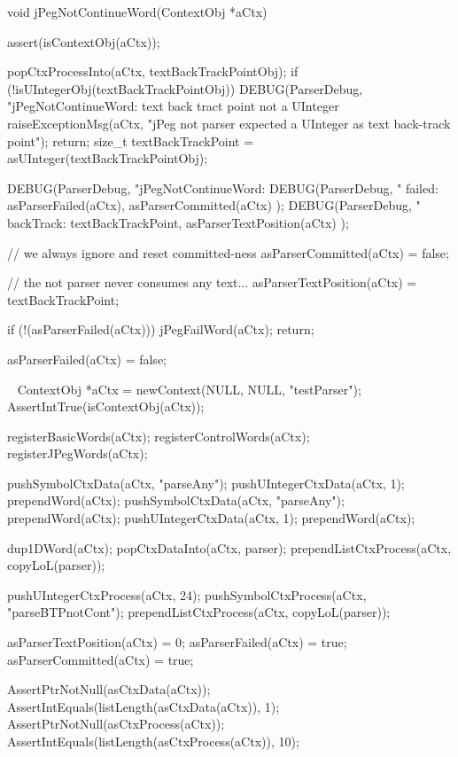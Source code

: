 \startCCode
void jPegNotContinueWord(ContextObj *aCtx) {
  assert(isContextObj(aCtx));

  popCtxProcessInto(aCtx, textBackTrackPointObj);
  if (!isUIntegerObj(textBackTrackPointObj)) {
    DEBUG(ParserDebug,
      "jPegNotContinueWord: text back tract point not a UInteger%
    raiseExceptionMsg(aCtx,
      "jPeg not parser expected a UInteger as text back-track point");
    return;
  }
  size_t textBackTrackPoint = asUInteger(textBackTrackPointObj);
  
  DEBUG(ParserDebug, "jPegNotContinueWord:%
  DEBUG(ParserDebug,
    "  failed: %
    asParserFailed(aCtx), asParserCommitted(aCtx)
  );
  DEBUG(ParserDebug,
    "  backTrack: %
    textBackTrackPoint, asParserTextPosition(aCtx)
  );

  // we always ignore and reset committed-ness
  asParserCommitted(aCtx) = false;
  
  // the not parser never consumes any text...
  asParserTextPosition(aCtx) = textBackTrackPoint;
  
  if (!(asParserFailed(aCtx))) {
    jPegFailWord(aCtx);
    return;
  }

  asParserFailed(aCtx) = false;
}
\stopCCode

\CTestsSuiteSetup\
\startCTest
  ContextObj *aCtx = newContext(NULL, NULL, "testParser");
  AssertIntTrue(isContextObj(aCtx));
  
  registerBasicWords(aCtx);
  registerControlWords(aCtx);
  registerJPegWords(aCtx);
  
  pushSymbolCtxData(aCtx, "parseAny");
  pushUIntegerCtxData(aCtx, 1);
  prependWord(aCtx);
  pushSymbolCtxData(aCtx, "parseAny");
  prependWord(aCtx);
  pushUIntegerCtxData(aCtx, 1);
  prependWord(aCtx);  
\stopCTest

\startCTest
  dup1DWord(aCtx);
  popCtxDataInto(aCtx, parser);
  prependListCtxProcess(aCtx, copyLoL(parser));
  
  pushUIntegerCtxProcess(aCtx, 24);
  pushSymbolCtxProcess(aCtx, "parseBTPnotCont");
  prependListCtxProcess(aCtx, copyLoL(parser));

  asParserTextPosition(aCtx) = 0;
  asParserFailed(aCtx)       = true;
  asParserCommitted(aCtx)    = true;
  
  AssertPtrNotNull(asCtxData(aCtx));
  AssertIntEquals(listLength(asCtxData(aCtx)), 1);
  AssertPtrNotNull(asCtxProcess(aCtx));
  AssertIntEquals(listLength(asCtxProcess(aCtx)), 10);
  
